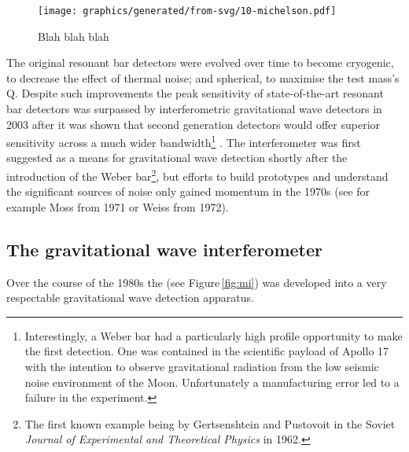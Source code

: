 \begin{wrapfigure}{r}{0.5\textwidth}
  \texttt{[image: graphics/generated/from-svg/10-michelson.pdf]}
  \caption{Blah blah blah}
\end{wrapfigure}

The original resonant bar detectors were evolved over time to become cryogenic, to decrease the effect of thermal noise; and spherical, to maximise the test mass's Q. Despite such improvements the peak sensitivity of state-of-the-art resonant bar detectors was surpassed by interferometric gravitational wave detectors in 2003 \cite{Pitkin2011} after it was shown that second generation detectors would offer superior sensitivity across a much wider bandwidth\footnote{Interestingly, a Weber bar had a particularly high profile opportunity to make the first detection. One was contained in the scientific payload of Apollo 17 with the intention to observe gravitational radiation from the low seismic noise environment of the Moon. Unfortunately a manufacturing error led to a failure in the experiment.} \cite{Harry2002a}. The interferometer was first suggested as a means for gravitational wave detection shortly after the introduction of the Weber bar\footnote{The first known example being by Gertsenshtein and Pustovoit in the Soviet \emph{Journal of Experimental and Theoretical Physics} in 1962.}, but efforts to build prototypes and understand the significant sources of noise only gained momentum in the 1970s (see for example Moss \etal \cite{Moss1971} from 1971 or Weiss \cite{Weiss1972} from 1972).


\subsection{The gravitational wave interferometer}

Over the course of the 1980s the \MI (see Figure\,\ref{fig:mi}) was developed into a very respectable gravitational wave detection apparatus.


